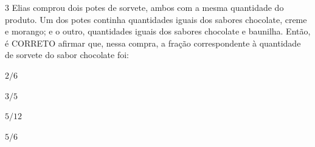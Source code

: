 




\num{3}  Elias comprou dois potes de sorvete, ambos com a mesma quantidade do
produto. Um dos potes continha quantidades iguais dos sabores chocolate,
creme e morango; e o outro, quantidades iguais dos sabores chocolate e
baunilha. Então, é CORRETO afirmar que, nessa compra, a fração
correspondente à quantidade de sorvete do sabor chocolate foi:

\begin{escolha}
\item$2/6$ 
\item$3/5$ 
\item$5/12$ 
\item$5/6$
\end{escolha}

